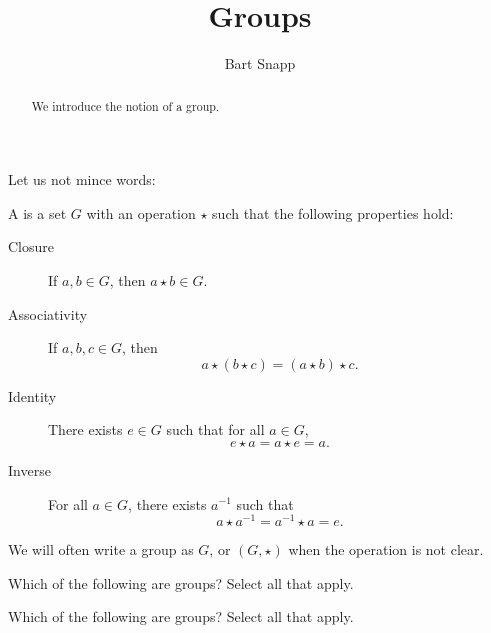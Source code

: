\documentclass{ximera}
\author{Bart Snapp}
\title{Groups}
\begin{document}
\begin{abstract}
  We introduce the notion of a group.
\end{abstract}
\maketitle

Let us not mince words:

\begin{definition}
  A  is a set $G$ with an operation $\star$ such that the
  following properties hold:
  \begin{description}
  \item[Closure] If $a,b\in G$, then $a\star b\in G$.
  \item[Associativity] If $a,b,c\in G$, then
    \[
    a\star(b\star c)  = (a\star b)\star c.
    \]
  \item[Identity] There exists $e\in G$ such that for all $a\in G$, 
    \[
    e\star a = a \star e  = a.
    \]
  \item[Inverse] For all $a\in G$, there exists $a^{-1}$ such that
    \[
    a\star a^{-1} = a^{-1}\star a = e.
    \]
  \end{description}
  We will often write a group as $G$, or $(G,\star)$ when the
  operation is not clear.
\end{definition}

\begin{exercise} %
  Which of the following are groups? Select all that apply.
  \begin{selectAll}
  \end{selectAll}
\end{exercise}

\begin{exercise} %
  Which of the following are groups? Select all that apply.
  \begin{selectAll}
  \end{selectAll}
\end{exercise}
\end{document}
